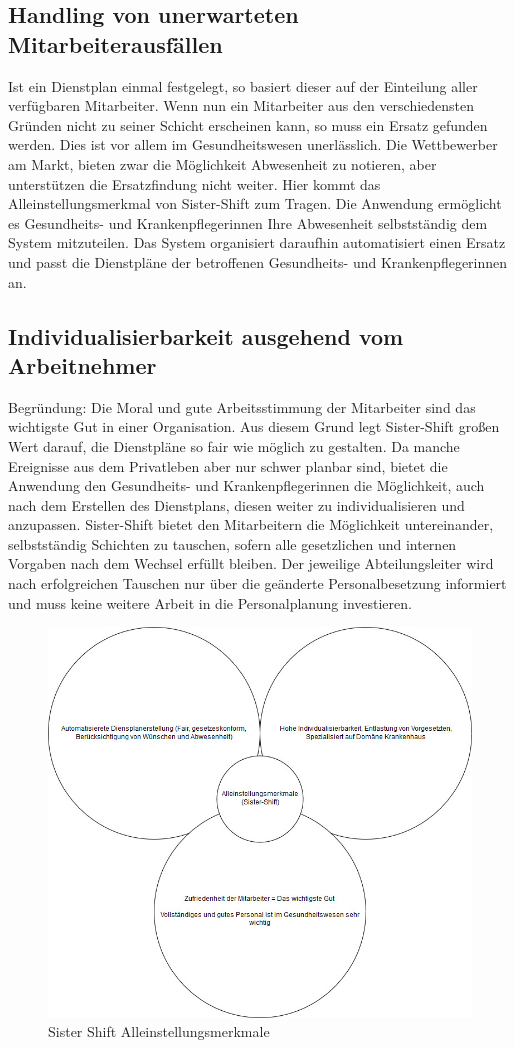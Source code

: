 \documentclass[10pt,a4paper]{article}
\begin{document}
\subsection{Handling von unerwarteten Mitarbeiterausfällen}
Ist ein Dienstplan einmal festgelegt, so basiert dieser auf der Einteilung aller verfügbaren Mitarbeiter. Wenn nun ein Mitarbeiter aus den verschiedensten Gründen nicht zu seiner Schicht erscheinen kann, so muss ein Ersatz gefunden werden. Dies ist vor allem im Gesundheitswesen unerlässlich. Die Wettbewerber am Markt, bieten zwar die Möglichkeit Abwesenheit zu notieren, aber unterstützen die Ersatzfindung nicht weiter. Hier kommt das Alleinstellungsmerkmal von Sister-Shift zum Tragen. Die Anwendung ermöglicht es Gesundheits- und Krankenpflegerinnen Ihre Abwesenheit selbstständig dem System mitzuteilen. Das System organisiert daraufhin automatisiert einen Ersatz und passt die Dienstpläne der betroffenen Gesundheits- und Krankenpflegerinnen an.
\subsection{Individualisierbarkeit ausgehend vom Arbeitnehmer}
Begründung: Die Moral und gute Arbeitsstimmung der Mitarbeiter sind das wichtigste Gut in einer Organisation. Aus diesem Grund legt Sister-Shift großen Wert darauf, die Dienstpläne so fair wie möglich zu gestalten. Da manche Ereignisse aus dem Privatleben aber nur schwer planbar sind, bietet die Anwendung den Gesundheits- und Krankenpflegerinnen die Möglichkeit, auch nach dem Erstellen des Dienstplans, diesen weiter zu individualisieren und anzupassen. Sister-Shift bietet den Mitarbeitern die Möglichkeit untereinander, selbstständig Schichten zu tauschen, sofern alle gesetzlichen und internen Vorgaben nach dem Wechsel erfüllt bleiben. Der jeweilige Abteilungsleiter wird nach erfolgreichen Tauschen nur über die geänderte Personalbesetzung informiert und muss keine weitere Arbeit in die Personalplanung investieren.
\begin{figure}
\includegraphics[scale=0.45]{Bilder/USP.jpg}{\centering}
\caption{Sister Shift Alleinstellungsmerkmale}
\end{figure}
\end{document}
